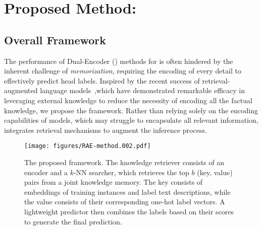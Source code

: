 \section{Proposed Method: \RAEXMC}
\label{sec:method}





\subsection{Overall Framework}
\label{sec:rae-framework}
The performance of Dual-Encoder (\DE) methods for \XMC is often hindered by the inherent challenge of \textit{memorization}, requiring the encoding of every detail to effectively predict head labels.
Inspired by the recent success of retrieval-augmented language models~\citep{khandelwal2020generalization,guu2020retrieval,izacard2023atlas,borgeaud2022improving},which have demonstrated remarkable efficacy in leveraging external knowledge to reduce the necessity of encoding all the factual knowledge, we propose the \RAEXMC framework.
Rather than relying solely on the encoding capabilities of \DE models, which may struggle to encapsulate all relevant information, \RAEXMC integrates retrieval mechanisms to augment the inference process.

\begin{figure}[!ht]
    \centering
    \texttt{[image: figures/RAE-method.002.pdf]}
    \caption{The proposed \RAEXMC framework. The knowledge retriever consists of an encoder and a $k$-NN searcher, which retrieves the top $b$ (key, value) pairs from a joint knowledge memory. The key consists of embeddings of training instances and label text descriptions, while the value consists of their corresponding one-hot label vectors. A lightweight predictor then combines the labels based on their scores to generate the final prediction.}
\label{fig:method}
\end{figure}

